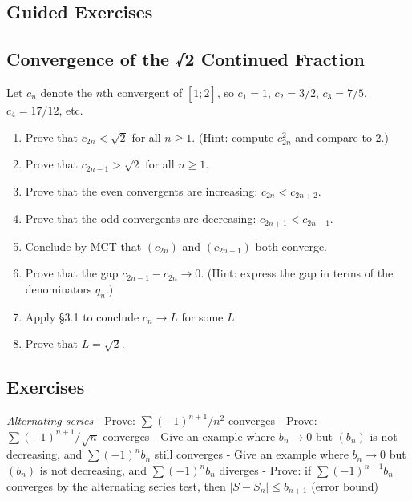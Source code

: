 \documentclass[
  10pt,
  letterpaper,
]{scrbook}
\begin{document}
\subsection{Guided Exercises}\label{guided-exercises-10}

\subsection{Convergence of the √2 Continued
Fraction}\label{convergence-of-the-2-continued-fraction}

Let \(c_n\) denote the \(n\)th convergent of \([1; \bar{2}]\), so
\(c_1 = 1\), \(c_2 = 3/2\), \(c_3 = 7/5\), \(c_4 = 17/12\), etc.

\begin{enumerate}
\def\labelenumi{(\alph{enumi})}
\item
  Prove that \(c_{2n} < \sqrt{2}\) for all \(n \geq 1\). (Hint: compute
  \(c_{2n}^2\) and compare to 2.)
\item
  Prove that \(c_{2n-1} > \sqrt{2}\) for all \(n \geq 1\).
\item
  Prove that the even convergents are increasing: \(c_{2n} < c_{2n+2}\).
\item
  Prove that the odd convergents are decreasing:
  \(c_{2n+1} < c_{2n-1}\).
\item
  Conclude by MCT that \((c_{2n})\) and \((c_{2n-1})\) both converge.
\item
  Prove that the gap \(c_{2n-1} - c_{2n} \to 0\). (Hint: express the gap
  in terms of the denominators \(q_n\).)
\item
  Apply §3.1 to conclude \(c_n \to L\) for some \(L\).
\item
  Prove that \(L = \sqrt{2}\).
\end{enumerate}

\subsection{Exercises}\label{exercises-15}

\emph{Alternating series} - Prove: \(\sum (-1)^{n+1}/n^2\) converges -
Prove: \(\sum (-1)^{n+1}/\sqrt{n}\) converges - Give an example where
\(b_n \to 0\) but \((b_n)\) is not decreasing, and \(\sum (-1)^n b_n\)
still converges - Give an example where \(b_n \to 0\) but \((b_n)\) is
not decreasing, and \(\sum (-1)^n b_n\) diverges - Prove: if
\(\sum (-1)^{n+1} b_n\) converges by the alternating series test, then
\(|S - S_n| \leq b_{n+1}\) (error bound)
\end{document}

